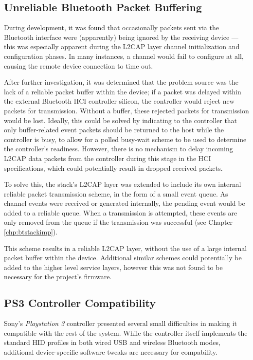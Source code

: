 \subsection{Unreliable Bluetooth Packet Buffering}

During development, it was found that occasionally packets sent via the Bluetooth interface were (apparently) being ignored by the receiving device --- this was especially apparent during the L2CAP layer channel initialization and configuration phases. In many instances, a channel would fail to configure at all, causing the remote device connection to time out.

After further investigation, it was determined that the problem source was the lack of a reliable packet buffer within the device; if a packet was delayed within the external Bluetooth HCI controller silicon, the controller would reject new packets for transmission. Without a buffer, these rejected packets for transmission would be lost. Ideally, this could be solved by indicating to the controller that only buffer-related event packets should be returned to the host while the controller is busy, to allow for a polled busy-wait scheme to be used to determine the controller's readiness. However, there is no mechanism to delay incoming L2CAP data packets from the controller during this stage in the HCI specifications, which could potentially result in dropped received packets.

To solve this, the stack's L2CAP layer was extended to include its own internal reliable packet transmission scheme, in the form of a small event queue. As channel events were received or generated internally, the pending event would be added to a reliable queue. When a transmission is attempted, these events are only removed from the queue if the transmission was successful (see Chapter \ref{chp:btstackimp}).

This scheme results in a reliable L2CAP layer, without the use of a large internal packet buffer within the device. Additional similar schemes could potentially be added to the higher level service layers, however this was not found to be necessary for the project's firmware.

\subsection{PS3 Controller Compatibility}

Sony's \textit{Playstation 3} controller presented several small difficulties in making it compatible with the rest of the system. While the controller itself implements the standard HID profiles in both wired USB and wireless Bluetooth modes, additional device-specific software tweaks are necessary for compability.

